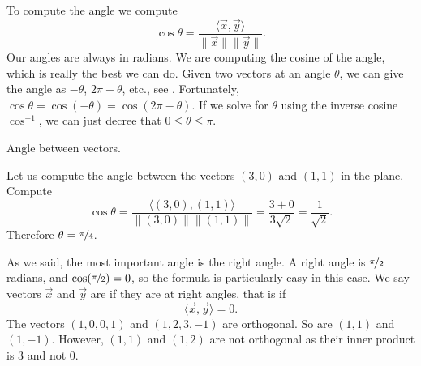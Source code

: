 %

To compute the angle we compute
\begin{equation*}
\cos \theta
=
\frac{\langle \vec{x}, \vec{y} \rangle}{\lVert{\vec{x}}\rVert
\lVert{\vec{y}}\rVert} .
\end{equation*}
Our angles are always in radians.
We are computing the cosine of the angle,
which is really the best
we can do.  Given two vectors at an angle $\theta$, we can give the angle as
$-\theta$, $2\pi-\theta$, etc.,
see .
Fortunately,
$\cos \theta = \cos (-\theta) = \cos(2\pi - \theta)$.
If we solve for $\theta$ using the inverse cosine $\cos^{-1}$,
we can just decree that $0 \leq \theta \leq \pi$.

\begin{myfig}
\capstart
{}
\caption{Angle between vectors.\label{vec-angle:fig}}
\end{myfig}

\begin{example}
Let us compute the angle between the vectors $(3,0)$ and $(1,1)$ in the
plane.
Compute
\begin{equation*}
\cos \theta =
\frac{\bigl\langle (3,0) , (1,1) \bigr\rangle}{\lVert(3,0)\rVert \lVert(1,1)\rVert}
=
\frac{3 + 0}{3 \sqrt{2}} = \frac{1}{\sqrt{2}} .
\end{equation*}
Therefore $\theta = \nicefrac{\pi}{4}$.
\end{example}

%

As we said, the most important angle is the right angle.  A right angle
is $\nicefrac{\pi}{2}$ radians, and $\cos (\nicefrac{\pi}{2}) = 0$, so the
formula is particularly easy in this case.
We say
vectors $\vec{x}$ and $\vec{y}$
are \emph{} if they are at right
angles, that is if
\begin{equation*}
\langle \vec{x} , \vec{y} \rangle
=
0 .
\end{equation*}
The vectors $(1,0,0,1)$ and $(1,2,3,-1)$ are orthogonal.  So
are $(1,1)$ and $(1,-1)$.  However, $(1,1)$ and $(1,2)$ are not orthogonal as
their inner product is $3$ and not 0.

